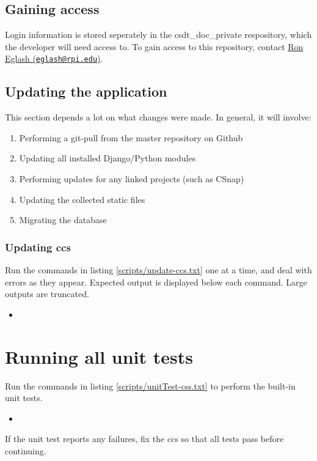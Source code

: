 \documentclass{article}
\newcommand{\insertcode}[2]{\begin{itemize}\item[]\end{itemize}} %
\begin{document}
\subsection{Gaining access}

Login information is stored seperately in the csdt\_doc\_private respository, which the developer will need access to.
To gain access to this repository, contact \href{mailto:eglash@rpi.edu}{Ron Eglash (\nolinkurl{eglash@rpi.edu})}.

\subsection{Updating the application}

This section depends a lot on what changes were made.
In general, it will involve:
\begin{enumerate}
 \item Performing a git-pull from the master repository on Github
 \item Updating all installed Django/Python modules
 \item Performing updates for any linked projects (such as CSnap)
 \item Updating the collected static files
 \item Migrating the database
\end{enumerate}

\subsubsection{Updating \ac{ccs}}

Run the commands in listing \ref{scripts/update-ccs.txt} one at a time, and deal with errors as they appear.
Expected output is displayed below each command.
Large outputs are truncated.

\label{update-ccs}
\insertcode{scripts/update-ccs.txt}{Updating the application}

\section{Running all unit tests}

Run the commands in listing \ref{scripts/unitTest-css.txt} to perform the built-in unit tests.

\label{unitTest-css}
\insertcode{scripts/unitTest-css.txt}{Running unit tests}

If the unit test reports any failures, fix the \ac{ccs} so that all tests pass before continuing.
\end{document}
